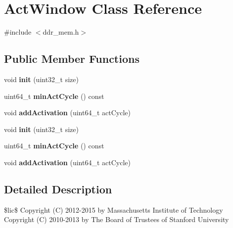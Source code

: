 \hypertarget{classActWindow}{\section{Act\-Window Class Reference}
\label{classActWindow}
}


{\ttfamily \#include $<$ddr\-\_\-mem.\-h$>$}

\subsection*{Public Member Functions}
\begin{DoxyCompactItemize}
\item 
\hypertarget{classActWindow_a225548b760e388e0b6973c1186b341cc}{void {\bfseries init} (uint32\-\_\-t size)}\label{classActWindow_a225548b760e388e0b6973c1186b341cc}

\item 
\hypertarget{classActWindow_a3727d383d4d5a32afdf1f12ba9674a0a}{uint64\-\_\-t {\bfseries min\-Act\-Cycle} () const }\label{classActWindow_a3727d383d4d5a32afdf1f12ba9674a0a}

\item 
\hypertarget{classActWindow_a062fcd84cef712aa8c05cc7078d3ed06}{void {\bfseries add\-Activation} (uint64\-\_\-t act\-Cycle)}\label{classActWindow_a062fcd84cef712aa8c05cc7078d3ed06}

\item 
\hypertarget{classActWindow_a225548b760e388e0b6973c1186b341cc}{void {\bfseries init} (uint32\-\_\-t size)}\label{classActWindow_a225548b760e388e0b6973c1186b341cc}

\item 
\hypertarget{classActWindow_a3727d383d4d5a32afdf1f12ba9674a0a}{uint64\-\_\-t {\bfseries min\-Act\-Cycle} () const }\label{classActWindow_a3727d383d4d5a32afdf1f12ba9674a0a}

\item 
\hypertarget{classActWindow_a062fcd84cef712aa8c05cc7078d3ed06}{void {\bfseries add\-Activation} (uint64\-\_\-t act\-Cycle)}\label{classActWindow_a062fcd84cef712aa8c05cc7078d3ed06}

\end{DoxyCompactItemize}


\subsection{Detailed Description}
\$lic\$ Copyright (C) 2012-\/2015 by Massachusetts Institute of Technology Copyright (C) 2010-\/2013 by The Board of Trustees of Stanford University

